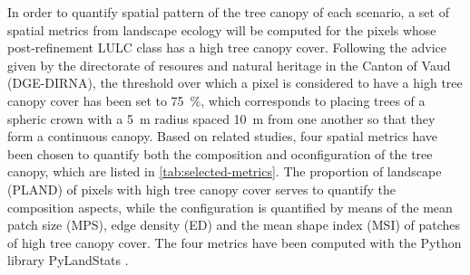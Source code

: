 \documentclass[12pt]{iopart}
\begin{document}
In order to quantify spatial pattern of the tree canopy of each scenario, a set of spatial metrics from landscape ecology \cite{o1988indices,mcgarigal2012fragstats} will be computed for the pixels whose post-refinement LULC class has a high tree canopy cover.  %
Following the advice given by the directorate of resoures and natural heritage in the Canton of Vaud (DGE-DIRNA), the threshold over which a pixel is considered to have a high tree canopy cover has been set to 75~\%, which corresponds to placing trees of a spheric crown with a 5~m radius spaced 10~m from one another so that they form a continuous canopy.
Based on related studies, four spatial metrics have been chosen to quantify both the composition and oconfiguration of the tree canopy, which are listed in \autoref{tab:selected-metrics}. The proportion of landscape (PLAND) of pixels with high tree canopy cover serves to quantify the composition aspects, while the configuration is quantified by means of the mean patch size (MPS), edge density (ED) and the mean shape index (MSI) of patches of high tree canopy cover. The four metrics have been computed with the Python library PyLandStats \cite{bosch2019pylandstats}.
\end{document}
